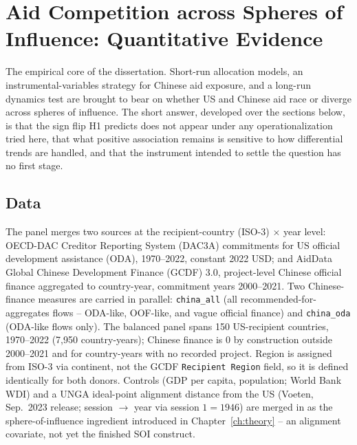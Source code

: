 %
\chapter{Aid Competition across Spheres of Influence: Quantitative Evidence}
\label{ch:quant}

The empirical core of the dissertation. Short-run allocation models, an
instrumental-variables strategy for Chinese aid exposure, and a long-run
dynamics test are brought to bear on whether US and Chinese aid race or diverge
across spheres of influence. The short answer, developed over the sections
below, is that the sign flip H1 predicts does not appear under any
operationalization tried here, that what positive association remains is
sensitive to how differential trends are handled, and that the instrument
intended to settle the question has no first stage.

\section{Data}
\label{sec:quant-data}
The panel merges two sources at the recipient-country (ISO-3) $\times$ year
level: OECD-DAC Creditor Reporting System (DAC3A) commitments for US official
development assistance (ODA), 1970--2022, constant 2022 USD; and AidData Global
Chinese Development Finance (GCDF) 3.0, project-level Chinese official finance
aggregated to country-year, commitment years 2000--2021. Two Chinese-finance
measures are carried in parallel: \texttt{china\_all} (all
recommended-for-aggregates flows -- ODA-like, OOF-like, and vague official
finance) and \texttt{china\_oda} (ODA-like flows only). The balanced panel spans
150 US-recipient countries, 1970--2022 (7{,}950 country-years); Chinese finance
is 0 by construction outside 2000--2021 and for country-years with no recorded
project. Region is assigned from ISO-3 via continent, not the GCDF
\texttt{Recipient Region} field, so it is defined identically for both donors.
Controls (GDP per capita, population; World Bank WDI) and a UNGA ideal-point
alignment distance from the US (Voeten, Sep.\ 2023 release; session $\to$ year
via session $1=1946$) are merged in as the sphere-of-influence ingredient
introduced in Chapter~\ref{ch:theory} -- an alignment covariate, not yet the
finished SOI construct.

